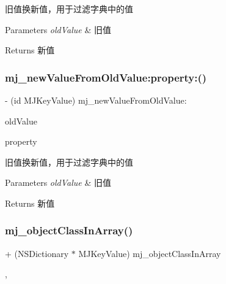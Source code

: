 旧值换新值，用于过滤字典中的值


\begin{DoxyParams}{Parameters}
{\em old\+Value} & 旧值\\
\hline
\end{DoxyParams}
\begin{DoxyReturn}{Returns}
新值 
\end{DoxyReturn}
\mbox{\label{protocol_m_j_key_value_01-p_a6a4f763701529e800607aad6d51f680a}} 
\subsubsection{\texorpdfstring{mj\+\_\+new\+Value\+From\+Old\+Value\+:property\+:()}{mj\_newValueFromOldValue:property:()}\hspace{0.1cm}{\footnotesize\ttfamily [3/3]}}
{\footnotesize\ttfamily -\/ (id M\+J\+Key\+Value) mj\+\_\+new\+Value\+From\+Old\+Value\+: \begin{DoxyParamCaption}\item[{(id)}]{old\+Value }\item[{property:(\mbox{\hyperlink{interface_m_j_property}{M\+J\+Property}} $\ast$)}]{property }\end{DoxyParamCaption}\hspace{0.3cm}{\ttfamily [optional]}}

旧值换新值，用于过滤字典中的值


\begin{DoxyParams}{Parameters}
{\em old\+Value} & 旧值\\
\hline
\end{DoxyParams}
\begin{DoxyReturn}{Returns}
新值 
\end{DoxyReturn}
\mbox{\label{protocol_m_j_key_value_01-p_a296b17988a1fd2d7ff15b0e73e612a4e}} 
\subsubsection{\texorpdfstring{mj\+\_\+object\+Class\+In\+Array()}{mj\_objectClassInArray()}\hspace{0.1cm}{\footnotesize\ttfamily [1/3]}}
{\footnotesize\ttfamily + (N\+S\+Dictionary $\ast$ M\+J\+Key\+Value) mj\+\_\+object\+Class\+In\+Array \begin{DoxyParamCaption}{ }\end{DoxyParamCaption}\hspace{0.3cm}{\ttfamily [static]}, {\ttfamily [optional]}}

